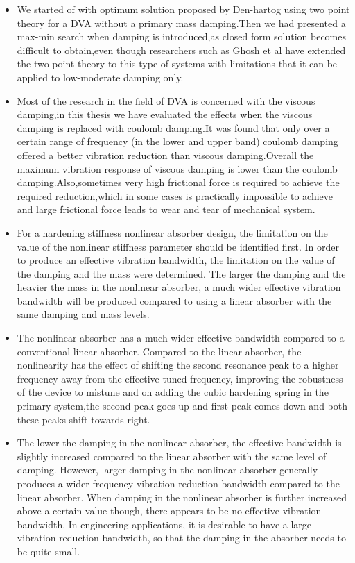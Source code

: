 \begin{itemize}
\item We started of with optimum solution proposed by Den-hartog using two point theory for a DVA without a primary mass damping.Then we had presented a max-min search when damping is introduced,as closed form solution becomes difficult to obtain,even though researchers such as Ghosh et al have extended the two point theory to this type of systems with limitations that it can be applied to low-moderate damping only.

\item Most of the research in the field of DVA is concerned with the viscous damping,in this thesis we have evaluated the effects when the viscous damping is replaced with coulomb damping.It was found that only over a certain range of frequency (in the lower and upper band) coulomb damping offered a better vibration reduction than viscous damping.Overall the maximum vibration response of viscous damping is lower than the coulomb damping.Also,sometimes very high frictional force is required to achieve the required reduction,which in some cases is practically impossible to achieve and large frictional force leads to wear and tear of mechanical system.

\item For a hardening stiffness nonlinear absorber design, the limitation on the value of the nonlinear stiffness parameter should be identified first. In order to produce an effective vibration bandwidth, the limitation on the value of the damping and the mass were determined. The larger the damping and the heavier the mass in the nonlinear absorber, a much wider effective vibration bandwidth will be produced compared to using a linear absorber with the same damping and mass levels. 

\item The nonlinear absorber has a much wider effective bandwidth compared to a conventional linear absorber. Compared to the linear absorber, the nonlinearity has the effect of shifting the second resonance peak to a higher frequency away from the effective tuned frequency, improving the robustness of the device to mistune and on adding the cubic hardening spring in the primary system,the second peak goes up and first peak comes down and both these peaks shift towards right.

\item The lower the damping in the nonlinear absorber, the effective bandwidth is slightly increased compared to the linear absorber with the same level of damping. However, larger damping in the nonlinear absorber generally produces a wider frequency vibration reduction bandwidth compared to the linear absorber. When damping in the nonlinear absorber is further increased above a certain value though, there appears to be no effective vibration bandwidth. In engineering applications, it is desirable to have a large vibration reduction bandwidth, so that the damping in the absorber needs to be quite small.


\end{itemize}
